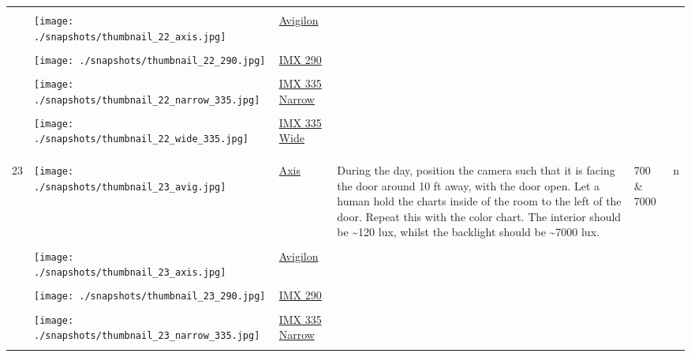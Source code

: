 \documentclass{article}%
\begin{document}
\begin{longtabu}{m{2.5cm} m{4cm} m{2cm} m{4cm} m{2cm} m{2cm}}
&&&&&\\%
&\texttt{[image: ./snapshots/thumbnail\_22\_axis.jpg]}&\href{https://drive.google.com/file/d/1RuP1FdSRNkYCI-5TA64PWBilDctnzVqZ/view?usp=sharing}{Avigilon}&&&\\%
&&&&&\\%
&\texttt{[image: ./snapshots/thumbnail\_22\_290.jpg]}&\href{https://drive.google.com/file/d/16W50CSwA5JqmUoHU6dlOyfe5Pd2cE3vP/view?usp=sharing}{IMX 290}&&&\\%
&&&&&\\%
&\texttt{[image: ./snapshots/thumbnail\_22\_narrow\_335.jpg]}&\href{https://drive.google.com/file/d/1dc49T5xamWYa58A33kKjdMfUFXwU8RUN/view?usp=sharing}{IMX 335 Narrow}&&&\\%
&&&&&\\%
&\texttt{[image: ./snapshots/thumbnail\_22\_wide\_335.jpg]}&\href{https://drive.google.com/file/d/1c9AYu15RM-Ly4FyZisj_OLkK55nJjkma/view?usp=sharing}{IMX 335 Wide}&&&\\%
&&&&&\\%
&&&&&\\%
\hline%
&&&&&\\%
23&\texttt{[image: ./snapshots/thumbnail\_23\_avig.jpg]}&\href{https://drive.google.com/file/d/1bk5cCarp0aQL-46Yy9C9oSHtYcWGlhkK/view?usp=sharing}{Axis}&During the day, position the camera such that it is facing the door around 10 ft away, with the door open. Let a human hold the charts inside of the room to the left of the door. Repeat this with the color chart. The interior should be \textasciitilde{}120 lux, whilst the backlight should be \textasciitilde{}7000 lux.&700 \& 7000&n\\%
&&&&&\\%
&\texttt{[image: ./snapshots/thumbnail\_23\_axis.jpg]}&\href{https://drive.google.com/file/d/17O29UwpJwW4nGNwvejRCzZ0mbo66S-NS/view?usp=sharing}{Avigilon}&&&\\%
&&&&&\\%
&\texttt{[image: ./snapshots/thumbnail\_23\_290.jpg]}&\href{https://drive.google.com/file/d/1ilA8JRF8nNtEPRSLxt3Jsw_X0FzZ9JpS/view?usp=sharing}{IMX 290}&&&\\%
&&&&&\\%
&\texttt{[image: ./snapshots/thumbnail\_23\_narrow\_335.jpg]}&\href{https://drive.google.com/file/d/1zTwkdkk79HPv16rhiYVk07-4s77E9tqw/view?usp=sharing}{IMX 335 Narrow}&&&\\%
&&&&&\\%

\end{longtabu}
\end{document}
